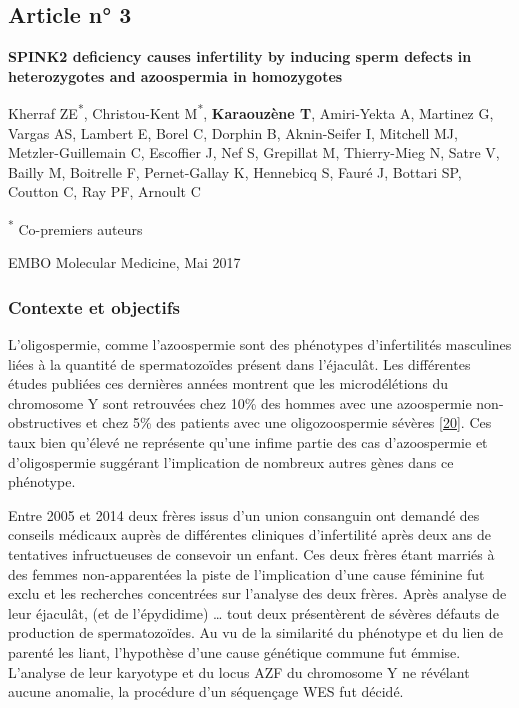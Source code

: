 \documentclass[12pt,twoside]{reedthesis}
\theoremstyle{definition}
\theoremstyle{definition}
\theoremstyle{remark}
\begin{document}
  \newpage
  
  \newpage  
  
  \subsection{Article n° 3}\label{article-n-3}
  
  \textbf{SPINK2 deficiency causes infertility by inducing sperm defects
  in heterozygotes and azoospermia in homozygotes}
  
  Kherraf ZE\textsuperscript{*}, Christou-Kent M\textsuperscript{*},
  \textbf{Karaouzène T}, Amiri-Yekta A, Martinez G, Vargas AS, Lambert E,
  Borel C, Dorphin B, Aknin-Seifer I, Mitchell MJ, Metzler-Guillemain C,
  Escoffier J, Nef S, Grepillat M, Thierry-Mieg N, Satre V, Bailly M,
  Boitrelle F, Pernet-Gallay K, Hennebicq S, Fauré J, Bottari SP, Coutton
  C, Ray PF, Arnoult C
  
  \textsuperscript{*} Co-premiers auteurs
  
  EMBO Molecular Medicine, Mai 2017
  
  \newpage
  
  \subsubsection{Contexte et objectifs}\label{contexte-et-objectifs}
  
  L'oligospermie, comme l'azoospermie sont des phénotypes d'infertilités
  masculines liées à la quantité de spermatozoïdes présent dans
  l'éjaculât. Les différentes études publiées ces dernières années
  montrent que les microdélétions du chromosome Y sont retrouvées chez
  10\% des hommes avec une azoospermie non-obstructives et chez 5\% des
  patients avec une oligozoospermie sévères
  {[}\protect\hyperlink{ref-Hotaling2014}{20}{]}. Ces taux bien qu'élevé
  ne représente qu'une infime partie des cas d'azoospermie et
  d'oligospermie suggérant l'implication de nombreux autres gènes dans ce
  phénotype.
  
  Entre 2005 et 2014 deux frères issus d'un union consanguin ont demandé
  des conseils médicaux auprès de différentes cliniques d'infertilité
  après deux ans de tentatives infructueuses de consevoir un enfant. Ces
  deux frères étant marriés à des femmes non-apparentées la piste de
  l'implication d'une cause féminine fut exclu et les recherches
  concentrées sur l'analyse des deux frères. Après analyse de leur
  éjaculât, (et de l'épydidime) \ldots{} tout deux présentèrent de sévères
  défauts de production de spermatozoïdes. Au vu de la similarité du
  phénotype et du lien de parenté les liant, l'hypothèse d'une cause
  génétique commune fut émmise. L'analyse de leur karyotype et du locus
  AZF du chromosome Y ne révélant aucune anomalie, la procédure d'un
  séquençage WES fut décidé.
  
\end{document}
